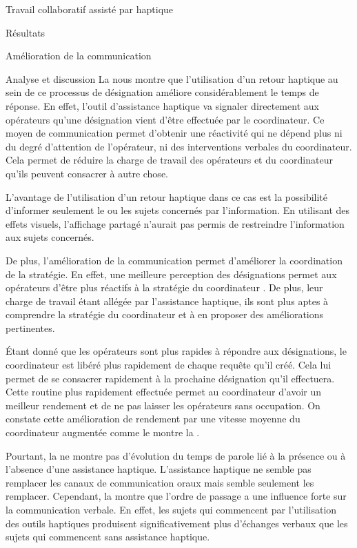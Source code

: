 \documentclass[myfrancais,ngerman,english,french]{mythesis}
\begin{document}
\begin{mychapter}{Travail collaboratif assisté par haptique}
\begin{mysection}{Résultats}
\begin{mysubsection}{Amélioration de la communication}
\begin{mysubsubsection}{Analyse et discussion}
					La  nous montre que l'utilisation d'un retour haptique au sein de ce processus de désignation améliore considérablement le temps de réponse.
					En effet, l'outil d'assistance haptique va signaler directement aux opérateurs qu'une désignation vient d'être effectuée par le coordinateur.
					Ce moyen de communication permet d'obtenir une réactivité qui ne dépend plus ni du degré d'attention de l'opérateur, ni des interventions verbales du coordinateur.
					Cela permet de réduire la charge de travail des opérateurs et du coordinateur qu'ils peuvent consacrer à autre chose.

					L'avantage de l'utilisation d'un retour haptique dans ce cas est la possibilité d'informer seulement le ou les sujets concernés par l'information.
					En utilisant des effets visuels, l'affichage partagé n'aurait pas permis de restreindre l'information aux sujets concernés.

					De plus, l'amélioration de la communication permet d'améliorer la coordination de la stratégie.
					En effet, une meilleure perception des désignations permet aux opérateurs d'être plus réactifs à la stratégie du coordinateur .
					De plus, leur charge de travail étant allégée par l'assistance haptique, ils sont plus aptes à comprendre la stratégie du coordinateur et à en proposer des améliorations pertinentes.

					Étant donné que les opérateurs sont plus rapides à répondre aux désignations, le coordinateur est libéré plus rapidement de chaque requête qu'il créé.
					Cela lui permet de se consacrer rapidement à la prochaine désignation qu'il effectuera.
					Cette routine plus rapidement effectuée permet au coordinateur d'avoir un meilleur rendement et de ne pas laisser les opérateurs sans occupation.
					On constate cette amélioration de rendement par une vitesse moyenne du coordinateur augmentée comme le montre la .

					Pourtant, la  ne montre pas d'évolution du temps de parole lié à la présence ou à l'absence d'une assistance haptique.
					L'assistance haptique ne semble pas remplacer les canaux de communication oraux mais semble seulement les remplacer.
					Cependant, la  montre que l'ordre de passage a une influence forte sur la communication verbale.
					En effet, les sujets qui commencent par l'utilisation des outils haptiques produisent significativement plus d'échanges verbaux que les sujets qui commencent sans assistance haptique.


\end{mysubsubsection}
\end{mysubsection}
\end{mysection}
\end{mychapter}
\end{document}
